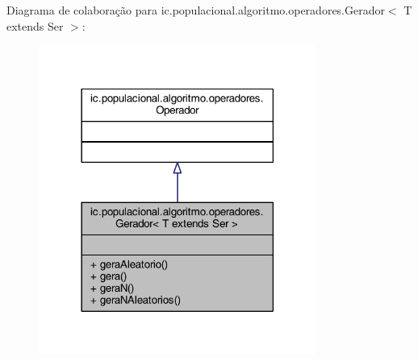 Diagrama de colaboração para ic.\-populacional.\-algoritmo.\-operadores.\-Gerador$<$ T extends Ser $>$\-:\nopagebreak
\begin{figure}[H]
\begin{center}
\leavevmode
\includegraphics[width=258pt]{classic_1_1populacional_1_1algoritmo_1_1operadores_1_1_gerador_3_01_t_01extends_01_ser_01_4__coll__graph}
\end{center}
\end{figure}
